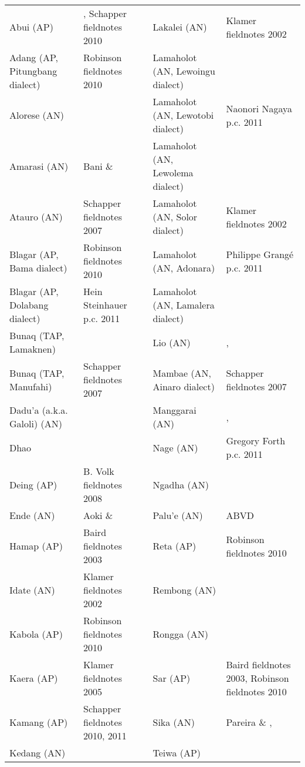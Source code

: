 {\begin{tabular}{llll}

Abui (AP) & \citet{Kratochvil2007}, Schapper fieldnotes 2010 & Lakalei (AN) & Klamer fieldnotes  2002\\
Adang (AP, Pitungbang dialect) & Robinson fieldnotes 2010 & Lamaholot (AN, Lewoingu dialect) &  \citet{NishiyamaEtAl2007}\\
Alorese (AN) & \citet{Klamer2011} & Lamaholot (AN, Lewotobi dialect) & Naonori Nagaya p.c. 2011\\
Amarasi (AN) & Bani \& \citet{Grimes2011} & Lamaholot (AN, Lewolema dialect) & \citet{Pampus2001}\\
Atauro (AN) & Schapper fieldnotes 2007 & Lamaholot (AN, Solor dialect) & Klamer fieldnotes  2002\\
Blagar (AP, Bama dialect) & Robinson fieldnotes 2010 & Lamaholot (AN, Adonara) & Philippe Grang\'e p.c. 2011\\
Blagar (AP, Dolabang dialect) & Hein Steinhauer p.c. 2011 & Lamaholot (AN, Lamalera dialect) & \citet{Keraf1978}\\
Bunaq (TAP, Lamaknen) & \citet{Schapper2010} & Lio (AN) & \citet[127-137, 44, 57, 60, 75, 110]{SawardoEtAl1987}, \citet{Arndt1933}\\
Bunaq (TAP, Manufahi) & Schapper fieldnotes 2007 & Mambae (AN, Ainaro dialect) & Schapper fieldnotes 2007\\
Dadu'a (a.k.a. Galoli) (AN) & \citet{Penn2006} & Manggarai (AN) & \citet[518]{Verheijen1967}, \citet[173]{1970}\\
Dhao & \citet{GrimesEtAl2008} & Nage (AN) & Gregory Forth p.c. 2011\\
Deing (AP) & B. Volk fieldnotes 2008 & Ngadha (AN) & \citet{Arndt1961}\\
Ende (AN) & Aoki \& \citet{Nakagawa1993} & Palu'e (AN) & ABVD \\
Hamap (AP) & Baird fieldnotes 2003 & Reta (AP) & Robinson fieldnotes 2010\\
Idate (AN) & Klamer fieldnotes  2002 & Rembong (AN) & \citet{Verheijen1978}\\
Kabola (AP) & Robinson fieldnotes 2010 & Rongga (AN) & \citet{ArkaEtAl2007}\\
Kaera (AP) & Klamer fieldnotes 2005 & Sar (AP) & Baird fieldnotes 2003,
Robinson fieldnotes 2010\\
Kamang (AP) & Schapper fieldnotes 2010, 2011 & Sika (AN) & Pareira \& \citet{Lewis1998},
\citet{Calon1890}\\
Kedang (AN) & \citet{Samely1991} & Teiwa (AP) & \citet{Klamer2010}\\

\end{tabular}}
